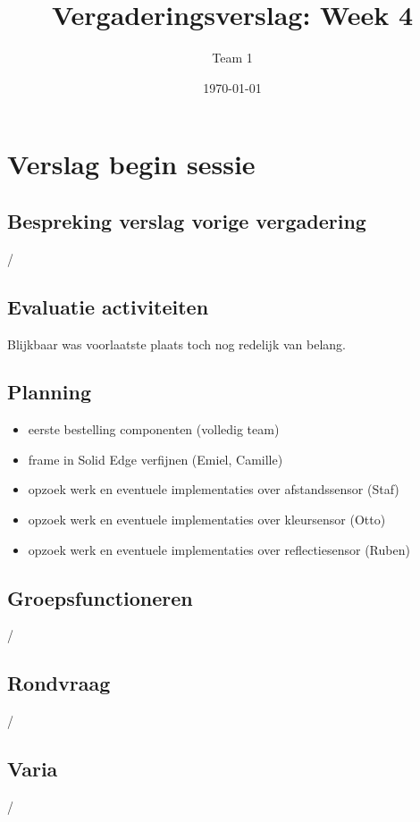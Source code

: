 \documentclass[a4paper,kulak]{kulakarticle} %
\date{\today}
\title{Vergaderingsverslag: Week 4}
\author{Team 1}
\begin{document}
\maketitle

\section{Verslag begin sessie}

\subsection{Bespreking verslag vorige vergadering}
/

\subsection{Evaluatie activiteiten}
Blijkbaar was voorlaatste plaats toch nog redelijk van belang. 


\subsection{Planning}
\begin{itemize}
	\item eerste bestelling componenten (volledig team)
	\item frame in Solid Edge verfijnen (Emiel, Camille)
	\item opzoek werk en eventuele implementaties over afstandssensor (Staf)
	\item opzoek werk en eventuele implementaties over kleursensor (Otto)
	\item opzoek werk en eventuele implementaties over reflectiesensor (Ruben)
	
\end{itemize}

\subsection{Groepsfunctioneren}
/

\subsection{Rondvraag}
/

\subsection{Varia}
/
\end{document}
